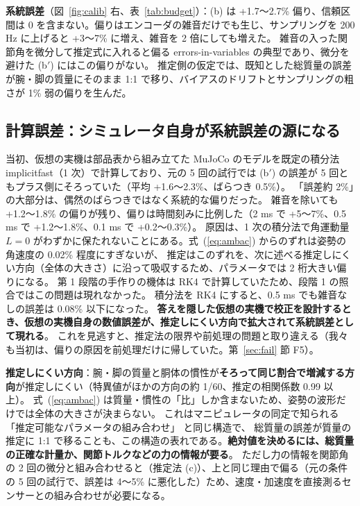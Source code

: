\documentclass[paper=a4paper,fontsize=10pt,twocolumn,column_gap=2zw,line_length=24zw,number_of_lines=46,head_space=20mm]{jlreq}
\begin{document}
\textbf{系統誤差}（図~\ref{fig:calib} 右、表~\ref{tab:budget}）：(b) は +1.7〜2.7\% 偏り、信頼区間は 0 を含まない。偏りはエンコーダの雑音だけでも生じ、サンプリングを 200 Hz に上げると +3〜7\% に増え、雑音を 2 倍にしても増えた。
雑音の入った関節角を微分して推定式に入れると偏る errors-in-variables の典型であり、微分を避けた (b$'$) にはこの偏りがない。
推定側の仮定では、既知とした総質量の誤差が腕・脚の質量にそのまま 1:1 で移り、バイアスのドリフトとサンプリングの粗さが 1\% 弱の偏りを生んだ。

\subsection{計算誤差：シミュレータ自身が系統誤差の源になる}
当初、仮想の実機は部品表から組み立てた MuJoCo のモデルを既定の積分法 implicitfast（1 次）で計算しており、元の 5 回の試行では (b$'$) の誤差が 5 回ともプラス側にそろっていた（平均 +1.6〜2.3\%、ばらつき 0.5\%）。
「誤差約 2\%」の大部分は、偶然のばらつきではなく系統的な偏りだった。
雑音を除いても +1.2〜1.8\% の偏りが残り、偏りは時間刻みに比例した（2 ms で +5〜7\%、0.5 ms で +1.2〜1.8\%、0.1 ms で +0.2〜0.3\%）。
原因は、1 次の積分法で角運動量 $L=0$ がわずかに保たれないことにある。式~(\ref{eq:ambac}) からのずれは姿勢の角速度の 0.02\% 程度にすぎないが、
推定はこのずれを、次に述べる推定しにくい方向（全体の大きさ）に沿って吸収するため、パラメータでは 2 桁大きい偏りになる。
第 1 段階の手作りの機体は RK4 で計算していたため、段階 1 の照合ではこの問題は現れなかった。
積分法を RK4 にすると、0.5 ms でも雑音なしの誤差は 0.08\% 以下になった。
\textbf{答えを隠した仮想の実機で校正を設計するとき、仮想の実機自身の数値誤差が、推定しにくい方向で拡大されて系統誤差として現れる}。
これを見逃すと、推定法の限界や前処理の問題と取り違える（我々も当初は、偏りの原因を前処理だけに帰していた。第~\ref{sec:fail} 節 F5）。

\textbf{推定しにくい方向}：腕・脚の質量と胴体の慣性が\textbf{そろって同じ割合で増減する方向}が推定しにくい（特異値がほかの方向の約 1/60、推定の相関係数 0.99 以上）。
式~(\ref{eq:ambac}) は質量・慣性の「比」しか含まないため、姿勢の波形だけでは全体の大きさが決まらない。
これはマニピュレータの同定で知られる「推定可能なパラメータの組み合わせ」\cite{gautier1990} と同じ構造で、
総質量の誤差が質量の推定に 1:1 で移ることも、この構造の表れである。\textbf{絶対値を決めるには、総質量の正確な計量か、関節トルクなどの力の情報が要る}。
ただし力の情報を関節角の 2 回の微分と組み合わせると（推定法 (c)）、上と同じ理由で偏る（元の条件の 5 回の試行で、誤差は 4〜5\% に悪化した）ため、速度・加速度を直接測るセンサーとの組み合わせが必要になる。
\end{document}
